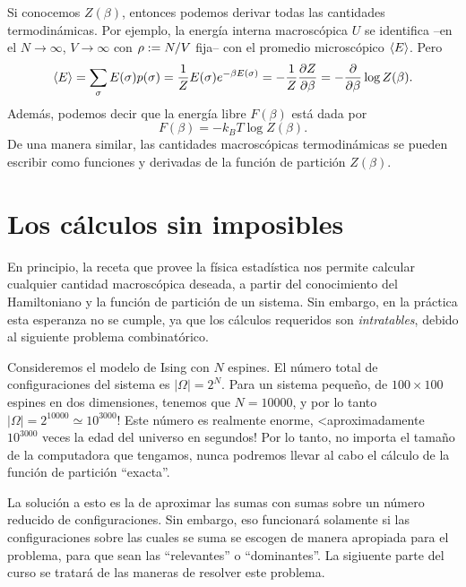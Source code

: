 Si conocemos $Z(\beta)$, entonces podemos derivar todas las cantidades
termodinámicas. Por ejemplo, la energía interna macroscópica $U$ se identifica
--en el  $N\to \infty$, $V \to \infty$ con $\rho
:= N/V$ fija-- con el promedio microscópico $\left \langle E \right \rangle$. Pero
\begin{equation}
\left \langle E \right \rangle =  \sum_{\mathbf{\sigma}} E(\mathbf{\sigma}) p(\mathbf{\sigma}) = \frac{1}{Z} E(\mathbf{\sigma}) e^{-\beta E(\mathbf{\sigma})}  =
-\frac{1}{Z} \frac{\partial Z}{\partial \beta} = -\frac{\partial }{\partial \beta} \log Z(\beta).
\end{equation}
Además, podemos decir que la energía libre $F(\beta)$ está dada por
\begin{equation}
 F(\beta) = -k_B T \log Z(\beta).
\end{equation}
De una manera similar, las cantidades macroscópicas termodinámicas se pueden
escribir como funciones y derivadas de la función de partición $Z(\beta)$.

\section{Los cálculos sin imposibles}
En principio, la receta que provee la física estadística nos permite calcular
cualquier cantidad macroscópica deseada, a partir del conocimiento del
Hamiltoniano y la función de partición de un sistema. Sin embargo, en la
práctica esta esperanza no se cumple, ya que los cálculos requeridos son
\emph{intratables}, debido al siguiente problema combinatórico.

Consideremos el modelo de Ising con $N$ espines. El número total de
configuraciones del sistema es $|\Omega| = 2^N$. Para un sistema pequeño, de
$100 \times 100$ espines en dos dimensiones, tenemos que $N=10000$, y por lo
tanto $|\Omega| = 2^{10000} \simeq 10^{3000}$!  Este número es realmente
enorme, <aproximadamente $10^{3000}$ veces la edad del universo en segundos!
Por lo tanto, no importa el tamaño de la computadora que tengamos, nunca
podremos llevar al cabo el cálculo de la función de partición ``exacta''.

La solución a esto es la de aproximar las sumas con sumas sobre un número
reducido de configuraciones. Sin embargo, eso funcionará solamente si las
configuraciones sobre las cuales se suma se escogen de manera apropiada para el
problema, para que sean las ``relevantes'' o  ``dominantes''.  La sigiuente
parte del curso se tratará de las maneras de resolver este problema.





